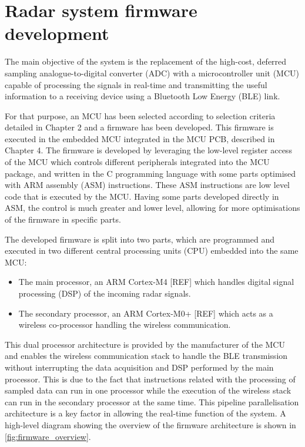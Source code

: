 \chapter{Radar system firmware development}
The main objective of the system is the replacement of the high-cost, deferred sampling analogue-to-digital converter (ADC) with a microcontroller unit (MCU) capable of processing the signals in real-time and transmitting the useful information to a receiving device using a Bluetooth Low Energy (BLE) link.

For that purpose, an MCU has been selected according to selection criteria detailed in Chapter 2 and a firmware has been developed. This firmware is executed in the embedded MCU integrated in the MCU PCB, described in Chapter 4. %
The firmware is developed by leveraging the low-level register access of the MCU which controls different peripherals integrated into the MCU package, and written in the C programming language with some parts optimised with ARM assembly (ASM) instructions. These ASM instructions are low level code that is executed by the MCU. Having some parts developed directly in ASM, the control is much greater and lower level, allowing for more optimisations of the firmware in specific parts.

The developed firmware is split into two parts, which are programmed and executed in two different central processing units (CPU) embedded into the same MCU:
\begin{itemize}
	\item The main processor, an ARM Cortex-M4 [REF] which handles digital signal processing (DSP) of the incoming radar signals.
	\item The secondary processor, an ARM Cortex-M0+ [REF] which acts as a wireless co-processor handling the wireless communication.
\end{itemize}

This dual processor architecture is provided by the manufacturer of the MCU and enables the wireless communication stack to handle the BLE transmission without interrupting the data acquisition and DSP performed by the main processor. This is due to the fact that instructions related with the processing of sampled data can run in one processor while the execution of the wireless stack can run in the secondary processor at the same time. This pipeline parallelisation architecture is a key factor in allowing the real-time function of the system. A high-level diagram showing the overview of the firmware architecture is shown in \cref{fig:firmware_overview}.

